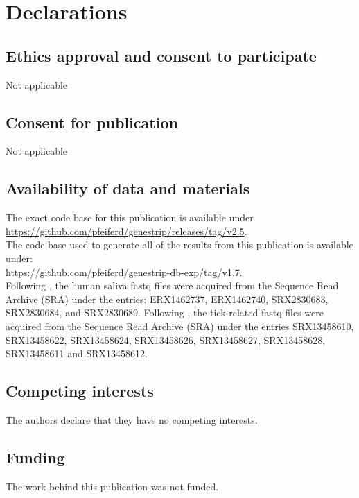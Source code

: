 \documentclass[pdflatex,sn-vancouver-num]{sn-jnl}
\begin{document}
\section{Declarations}

\subsection{Ethics approval and consent to participate}

Not applicable

\subsection{Consent for publication}

Not applicable

\subsection{Availability of data and materials}

The exact code base for this publication is available under\\
\url{https://github.com/pfeiferd/genestrip/releases/tag/v2.5}.\\
The code base used to generate all of the results from this publication is available under:\\
\url{https://github.com/pfeiferd/genestrip-db-exp/tag/v1.7}.\\
Following \cite{Samson:2020aa}, the human saliva fastq files were acquired from the Sequence Read Archive (SRA) under the entries: ERX1462737, ERX1462740, SRX2830683, SRX2830684, and SRX2830689.
Following \cite{nanoporeticks}, the tick-related fastq files were acquired from the Sequence Read Archive (SRA) under the entries SRX13458610, SRX13458622, SRX13458624, SRX13458626, SRX13458627, SRX13458628, SRX13458611 and SRX13458612.

\subsection{Competing interests}

The authors declare that they have no competing interests.

\subsection{Funding}

The work behind this publication was not funded.
\end{document}
